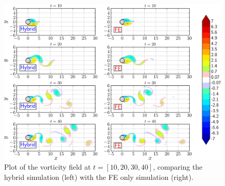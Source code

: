 	\begin{figure}[!p]
	\centering
	\includegraphics[width=\linewidth]{./figures/validation/isc/hybrid_cylinder_LongRun_contourfComparison-crop_fixed2.png}
	\caption{Plot of the vorticity field at $t=[10,20,30,40]$, comparing the hybrid simulation (left) with the FE only simulation (right).}
	\label{fig:hybrid_cylinder_LongRun_contourfComparison}
	\end{figure}
	
